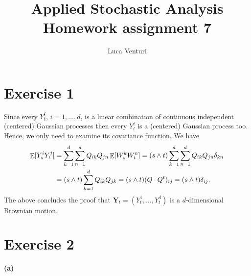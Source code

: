 \documentclass[a4paper,11pt]{article}
\theoremstyle{definition}
\theoremstyle{plain}
\theoremstyle{remark}
\DeclarePairedDelimiter{\parq}{[}{]}
\DeclareMathOperator*{\expval}{\mathbb{E}}
\begin{document}
\title{Applied Stochastic Analysis \\ Homework assignment 7}
\author{Luca Venturi}
\maketitle

\section*{Exercise 1}

Since every $Y_t^i$, $i=1,\dots,d$, is a linear combination of continuous independent (centered) Gaussian processes then every $Y_t^i$ is a (centered) Gaussian process too. Hence, we only need to examine its covariance function. We have
\begin{align*}
\expval\parq{Y^i_sY^j_t} & = \sum_{k=1}^d\sum_{n=1}^d Q_{ik}Q_{jn}\expval\parq{W^k_sW^n_t} = (s\wedge t)\sum_{k=1}^d\sum_{n=1}^d Q_{ik}Q_{jn}\delta_{kn} \\ & = (s\wedge t)\sum_{k=1}^dQ_{ik}Q_{jk} = (s\wedge t)(Q\cdot Q^t)_{ij} = (s\wedge t)\delta_{ij}.
\end{align*}
The above concludes the proof that $\mathbf{Y}_t = (Y^1_t,\dots,Y^d_t)$ is a $d$-dimensional Brownian motion. 

\section*{Exercise 2}

\paragraph*{(a)}
\end{document}
